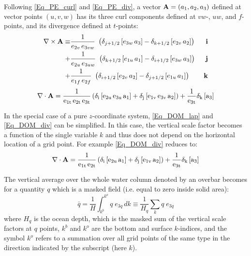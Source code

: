 Following \eqref{Eq_PE_curl} and \eqref{Eq_PE_div}, a vector ${\rm {\bf A}}=\left( a_1,a_2,a_3\right)$ 
defined at vector points $(u,v,w)$ has its three curl components defined at $vw$-, $uw$, 
and $f$-points, and its divergence defined at $t$-points:
\begin{eqnarray}  \label{Eq_DOM_curl}
 \nabla \times {\rm {\bf A}}\equiv &
      \frac{1}{e_{2v}\,e_{3vw} } \ \left( \delta_{j +1/2} \left[e_{3w}\,a_3 \right] -\delta_{k+1/2} \left[e_{2v} \,a_2 \right] \right)  &\ \mathbf{i} \\ 
 +& \frac{1}{e_{2u}\,e_{3uw}} \ \left( \delta_{k+1/2} \left[e_{1u}\,a_1  \right] -\delta_{i +1/2} \left[e_{3w}\,a_3 \right] \right)  &\ \mathbf{j} \\
 +& \frac{1}{e_{1f} \,e_{2f}    } \ \left( \delta_{i +1/2} \left[e_{2v}\,a_2  \right] -\delta_{j +1/2} \left[e_{1u}\,a_1 \right] \right)  &\ \mathbf{k}
 \end{eqnarray}
\begin{equation} \label{Eq_DOM_div}
\nabla \cdot \rm{\bf A}=\frac{1}{e_{1t}\,e_{2t}\,e_{3t}}\left( \delta_i \left[e_{2u}\,e_{3u}\,a_1 \right]
                                                                                         +\delta_j \left[e_{1v}\,e_{3v}\,a_2 \right] \right)+\frac{1}{e_{3t} }\delta_k \left[a_3 \right]
\end{equation}

In the special case of a pure $z$-coordinate system, \eqref{Eq_DOM_lap} and 
\eqref{Eq_DOM_div} can be simplified. In this case, the vertical scale factor 
becomes a function of the single variable $k$ and thus does not depend on the 
horizontal location of a grid point. For example \eqref{Eq_DOM_div} reduces to: 
\begin{equation*}
\nabla \cdot \rm{\bf A}=\frac{1}{e_{1t}\,e_{2t}} \left( \delta_i \left[e_{2u}\,a_1 \right] 
                                                                              +\delta_j \left[e_{1v}\, a_2 \right]  \right)
                                                     +\frac{1}{e_{3t}} \delta_k \left[             a_3 \right]
\end{equation*}

The vertical average over the whole water column denoted by an overbar becomes 
for a quantity $q$ which is a masked field (i.e. equal to zero inside solid area):
\begin{equation} \label{DOM_bar}
\bar q 	=         \frac{1}{H}    \int_{k^b}^{k^o} {q\;e_{3q} \,dk} 
		\equiv \frac{1}{H_q }\sum\limits_k {q\;e_{3q} }
\end{equation}
where $H_q$  is the ocean depth, which is the masked sum of the vertical scale 
factors at $q$ points, $k^b$ and $k^o$ are the bottom and surface $k$-indices, 
and the symbol $k^o$ refers to a summation over all grid points of the same type 
in the direction indicated by the subscript (here $k$). 

